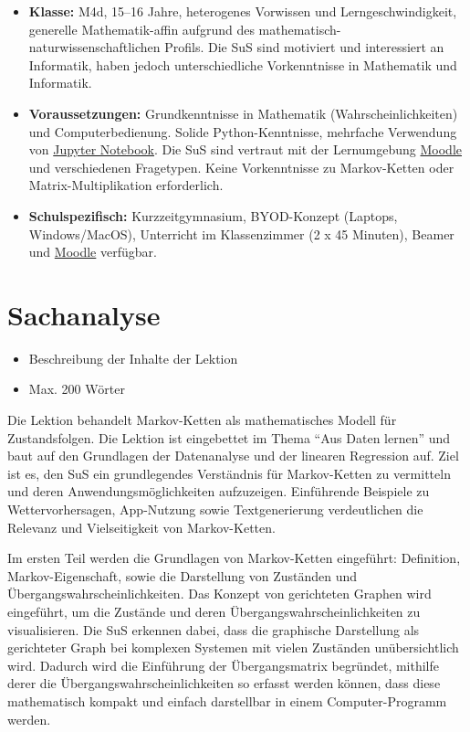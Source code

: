 \begin{itemize}
    \item \textbf{Klasse:} M4d, 15--16 Jahre, heterogenes Vorwissen und Lerngeschwindigkeit, generelle Mathematik-affin aufgrund des mathematisch-naturwissenschaftlichen Profils. Die SuS sind motiviert und interessiert an Informatik, haben jedoch unterschiedliche Vorkenntnisse in Mathematik und Informatik.
    \item \textbf{Voraussetzungen:} Grundkenntnisse in Mathematik (Wahrscheinlichkeiten) und Computerbedienung. Solide Python-Kenntnisse, mehrfache Verwendung von \href{https://cyrilwendl.github.io/datascience-jupyter/lab/index.html}{Jupyter Notebook}. Die SuS sind vertraut mit der Lernumgebung \href{https://moodle.kzn.ch}{Moodle} und verschiedenen Fragetypen. Keine Vorkenntnisse zu Markov-Ketten oder Matrix-Multiplikation erforderlich.
    \item \textbf{Schulspezifisch:} Kurzzeitgymnasium, BYOD-Konzept (Laptops, Windows/MacOS), Unterricht im Klassenzimmer (2 x 45 Minuten), Beamer und \href{https://moodle.kzn.ch}{Moodle} verfügbar.
\end{itemize}

\section*{Sachanalyse}
\begin{tcolorbox}[colback=gray!10, colframe=gray!80!black, title=Anforderungen]
    \begin{itemize}
        \item Beschreibung der Inhalte der Lektion
        \item Max. 200 Wörter
    \end{itemize}
\end{tcolorbox}

Die Lektion behandelt Markov-Ketten als mathematisches Modell für Zustandsfolgen. Die Lektion ist eingebettet im Thema \enquote{Aus Daten lernen} und baut auf den Grundlagen der Datenanalyse und der linearen Regression auf. Ziel ist es, den SuS ein grundlegendes Verständnis für Markov-Ketten zu vermitteln und deren Anwendungsmöglichkeiten aufzuzeigen. Einführende Beispiele zu Wettervorhersagen, App-Nutzung sowie Textgenerierung verdeutlichen die Relevanz und Vielseitigkeit von Markov-Ketten. 

Im ersten Teil werden die Grundlagen von Markov-Ketten eingeführt: Definition, Markov-Eigenschaft, sowie die Darstellung von Zuständen und Übergangswahrscheinlichkeiten. Das Konzept von gerichteten Graphen wird eingeführt, um die Zustände und deren Übergangswahrscheinlichkeiten zu visualisieren. Die SuS erkennen dabei, dass die graphische Darstellung als gerichteter Graph bei komplexen Systemen mit vielen Zuständen unübersichtlich wird. Dadurch wird die Einführung der Übergangsmatrix begründet, mithilfe derer die Übergangswahrscheinlichkeiten so erfasst werden können, dass diese mathematisch kompakt und einfach darstellbar in einem Computer-Programm werden.

